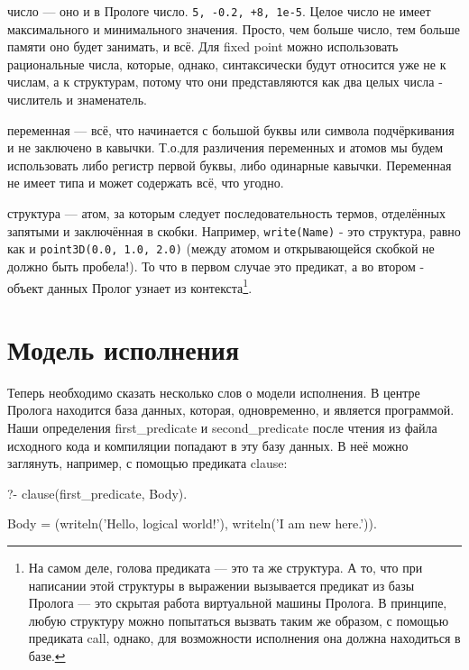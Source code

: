 \documentclass[a4paper]{book}
\def\To{Т.\thinspace о.}
\begin{document}
\begin{description}
  \item число --- оно и в Прологе
    число. \verb|5, -0.2, +8, 1e-5|. Целое число не имеет
    максимального и минимального значения. Просто, чем больше
    число, тем больше памяти оно будет занимать, и всё. Для fixed
    point можно использовать рациональные числа, которые, однако,
    синтаксически будут относится уже не к числам, а к
    структурам, потому что они представляются как два целых числа
    - числитель и знаменатель.

  \item переменная --- всё, что начинается с большой буквы или
    символа подчёркивания и не заключено в кавычки. \To для
    различения переменных и атомов мы будем использовать либо
    регистр первой буквы, либо одинарные кавычки. Переменная не
    имеет типа и может содержать всё, что угодно.

  \item структура --- атом, за которым следует последовательность
    термов, отделённых запятыми и заключённая в скобки. Например,
    \verb|write(Name)| - это структура, равно как и
    \verb|point3D(0.0, 1.0, 2.0)| (между атомом и открывающейся
    скобкой не должно быть пробела!). То что в первом случае это
    предикат, а во втором - объект данных Пролог узнает из
    контекста\footnote{На самом деле, голова предиката --- это та
      же структура. А то, что при написании этой структуры в
      выражении вызывается предикат из базы Пролога --- это
      скрытая работа виртуальной машины Пролога. В принципе,
      любую структуру можно попытаться вызвать таким же образом,
      с помощью предиката call, однако, для возможности
      исполнения она должна находиться в базе.}.
\end{description}

\section{Модель исполнения}
\label{prolog_execution_model}

Теперь необходимо сказать несколько слов о модели исполнения.  В
центре Пролога находится база данных, которая, одновременно, и
является программой. Наши определения first_predicate и
second_predicate после чтения из файла исходного кода и
компиляции попадают в эту базу данных. В неё можно заглянуть,
например, с помощью предиката clause:

\begin{example}{}{}
?- clause(first_predicate, Body).

Body = (writeln('Hello, logical world!'), writeln('I am new here.')).                                                       
\end{example}
\end{document}
